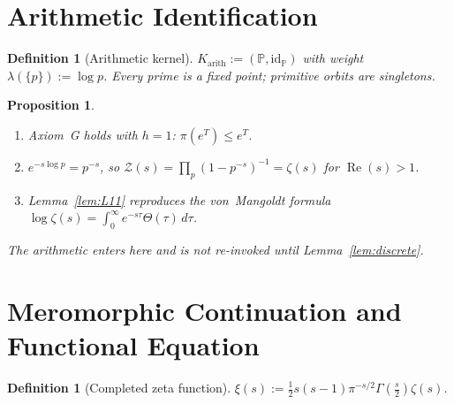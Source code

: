 \documentclass[12pt,a4paper]{article}
\newtheorem{proposition}[theorem]{Proposition}
\newtheorem{definition}[theorem]{Definition}
\theoremstyle{remark}
\begin{document}
\section{Arithmetic Identification}
\label{sec:arithmetic}

\begin{definition}[Arithmetic kernel]
$K_{\mathrm{arith}}:=(\mathbb{P},\mathrm{id}_\mathbb{P})$
with weight $\lambda(\{p\}):=\log p$.
Every prime is a fixed point; primitive orbits are singletons.
\end{definition}

\begin{proposition}\label{prop:arith}
\begin{enumerate}[label=(\roman*),leftmargin=*]
\item Axiom~G holds with $h=1$: $\pi(e^T)\le e^T$.
\item $e^{-s\log p}=p^{-s}$, so $\mathcal{Z}(s)=\prod_p(1-p^{-s})^{-1}=\zeta(s)$
for $\operatorname{Re}(s)>1$.
\item Lemma~\ref{lem:L11} reproduces the von~Mangoldt formula
$\log\zeta(s)=\int_0^\infty e^{-s\tau}\Theta(\tau)\,d\tau$.
\end{enumerate}
The arithmetic enters here and is not re-invoked until
Lemma~\ref{lem:discrete}.
\end{proposition}


\section{Meromorphic Continuation and Functional Equation}
\label{sec:FE}

\begin{definition}[Completed zeta function]
$\xi(s):=\tfrac{1}{2}s(s-1)\pi^{-s/2}\Gamma\!\left(\tfrac{s}{2}\right)\zeta(s)$.
\end{definition}
\end{document}
